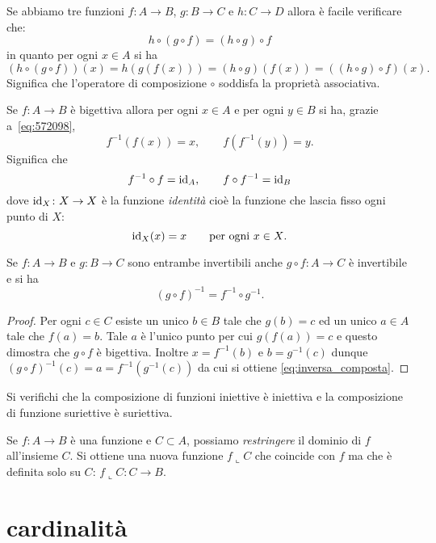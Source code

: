 Se abbiamo tre funzioni 
$f\colon A\to B$, $g\colon B\to C$ e $h\colon C\to D$ 
allora è facile verificare che:
\[
   h \circ (g\circ f) = (h\circ g) \circ f
\]
in quanto per ogni $x\in A$ si ha
\[
(h \circ (g\circ f)) (x) =
h(g(f(x))) = (h\circ g)(f(x)) = ((h\circ g) \circ f) (x).  
\]
Significa che l'operatore di composizione $\circ$
soddisfa la proprietà associativa.

Se $f\colon A\to B$ è bigettiva allora 
per ogni $x\in A$ e per ogni $y\in B$ si ha,
grazie a~\eqref{eq:572098},
\[
  f^{-1} (f(x)) = x,
  \qquad f(f^{-1}(y)) = y.
\]
Significa che 
\[
  f^{-1}\circ f = \mathrm{id}_A, 
  \qquad
  f\circ f^{-1} = \mathrm{id}_B
\] 
dove $\mathrm{id}_X\colon X\to X$
è la funzione 
\emph{identità}%
%
%
cioè la funzione 
che lascia fisso ogni punto di $X$:
%
\index{$\id$}%
\[
\mathrm{id}_X(x) = x \qquad \text{per ogni $x\in X$}.
\]

\begin{theorem}
Se $f\colon A\to B$ e $g\colon B\to C$ sono entrambe invertibili
anche $g\circ f\colon A\to C$ è invertibile e si ha 
\begin{equation}\label{eq:inversa_composta}
  (g\circ f)^{-1} = f^{-1}\circ g^{-1}.
\end{equation}
\end{theorem}
\begin{proof}    
Per ogni $c\in C$ esiste un unico $b\in B$ tale che $g(b)=c$ 
ed un unico $a\in A$ tale che $f(a)=b$. 
Tale $a$ è l'unico punto per cui $g(f(a))=c$ e questo dimostra che 
$g\circ f$ è bigettiva. Inoltre $x=f^{-1}(b)$ e $b=g^{-1}(c)$ 
dunque $(g\circ f)^{-1}(c) = a = f^{-1}(g^{-1}(c))$ da cui si ottiene 
\eqref{eq:inversa_composta}.
\end{proof}

\begin{exercise}
  Si verifichi che la composizione di funzioni iniettive è iniettiva e la composizione 
  di funzione suriettive è suriettiva.
\end{exercise}

\begin{definition}[restrizione]
  Se $f\colon A\to B$ è una funzione e $C\subset A$, possiamo 
  \emph{restringere} il dominio di $f$ all'insieme $C$.
  Si ottiene una nuova funzione $f\llcorner C$ che coincide con $f$
  ma che è definita solo su $C$: $f\llcorner C\colon C\to B$.
\end{definition}


\section{cardinalità}


